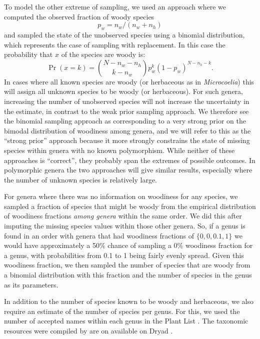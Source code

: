 To model the other extreme of sampling, we used an approach where we
computed the observed fraction of woody species 
\[p_w = n_w / (n_w +n_h)\] 
and sampled the state of the unobserved species using a
binomial distribution, which represents the case of sampling
with replacement. In this case the probability that $x$ of the species
are woody is:
\begin{equation}
  \Pr(x = k) = {N - n_w - n_h \choose k - n_w} 
  p_w^k (1-p_w)^{N - n_h - k}.
\end{equation}
%
In cases where all known species are woody (or herbaceous as in
\textit{Microcoelia}) this will assign all unknown species to be woody
(or herbaceous). For such genera, increasing the number of unobserved
species will not increase the uncertainty in the estimate, in contrast
to the weak prior sampling approach.
%
We therefore see the binomial sampling approach as corresponding to a
very strong prior on the bimodal distribution of woodiness among
genera, and we will refer to this as the ``strong prior'' approach
because it more strongly constrains the state of missing species
within genera with no known polymorphism.  While neither of these
approaches is ``correct'', they probably span the extremes of possible
outcomes.
%
In polymorphic genera the two approaches will give similar results,
especially where the number of unknown species is relatively large.

For genera where there was no information on woodiness for any
species, we sampled a fraction of species that might be woody from
the empirical distribution of woodiness fractions \textit{among
  genera} within the same order. We did this after imputing the
missing species values within those other genera. So, if a genus is
found in an order with genera that had woodiness fractions of $\{0, 0,
0.1, 1\}$ we would have approximately a 50\% chance of sampling a 0\%
woodiness fraction for a genus, with probabilities from 0.1 to 1 being
fairly evenly spread.  Given this woodiness fraction, we then sampled
the number of species that are woody from a binomial distribution with
this fraction and the number of species in the genus as its
parameters.

In addition to the number of species known to be woody and herbaceous,
we also require an estimate of the number of species per genus.  For this, we
used the number of accepted names within each genus in the Plant List
\citep{ThePlantList}. The taxonomic resources were compiled by \citet{Zanne}
are on available on Dryad \citep{ZanneDryad}.

